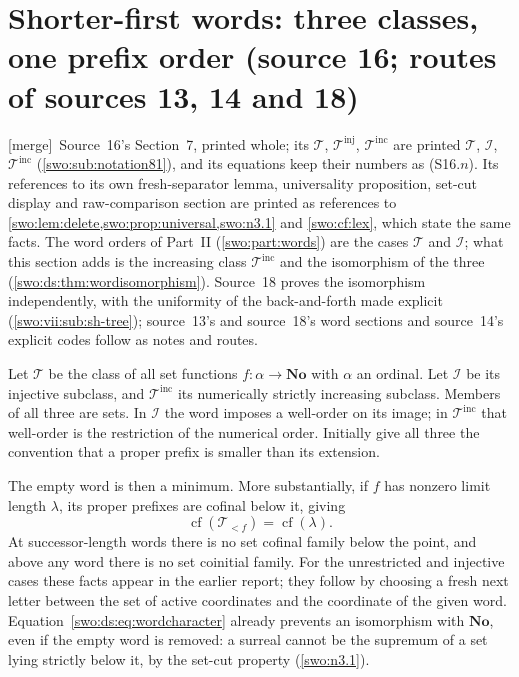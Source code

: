\documentclass[11pt]{article}
\theoremstyle{definition}
\theoremstyle{remark}
\newcommand{\No}{\mathbf{No}}
\newcommand{\Words}{\mathcal I}
\newcommand{\WordsAll}{\mathcal T}
\newcommand{\cf}{\operatorname{cf}}
\newcommand{\merge}{\textsf{[merge]}}
\newcommand{\WordsInc}{\mathcal T^{\mathrm{inc}}}
\begin{document}
\section{Shorter-first words: three classes, one prefix order (source 16; routes of sources 13, 14 and 18)}\label{swo:ds:sec:words}

\merge\ Source~16's Section~7, printed whole; its $\mathcal T$,
$\mathcal T^{\mathrm{inj}}$, $\mathcal T^{\mathrm{inc}}$ are printed $\WordsAll$,
$\Words$, $\WordsInc$ (\cref{swo:sub:notation81}), and its equations keep
their numbers as (S16.$n$). Its references to its own fresh-separator lemma,
universality proposition, set-cut display and raw-comparison section are
printed as references to \cref{swo:lem:delete,swo:prop:universal,swo:n3.1}
and \cref{swo:cf:lex}, which state the same facts. The word orders of Part~II
(\cref{swo:part:words}) are the cases $\WordsAll$ and $\Words$; what this
section adds is the increasing class $\WordsInc$ and the isomorphism of the
three (\cref{swo:ds:thm:wordisomorphism}). Source~18 proves the isomorphism
independently, with the uniformity of the back-and-forth made explicit
(\cref{swo:vii:sub:sh-tree}); source~13's and source~18's word sections and
source~14's explicit codes follow as notes and routes.

Let $\WordsAll$ be the class of all set functions $f:\alpha\to\No$ with
$\alpha$ an ordinal. Let $\Words$ be its injective subclass, and
$\WordsInc$ its numerically strictly increasing subclass. Members of all
three are sets. In $\Words$ the word imposes a well-order on its image;
in $\WordsInc$ that well-order is the restriction of the numerical order.
Initially give all three the convention that a proper prefix is smaller
than its extension.

The empty word is then a minimum. More substantially, if $f$ has nonzero
limit length $\lambda$, its proper prefixes are cofinal below it, giving
\[
 \cf(\WordsAll_{<f})=\cf(\lambda).
\tag{S16.5}\label{swo:ds:eq:wordcharacter}
\]
At successor-length words there is no set cofinal family below the point,
and above any word there is no set coinitial family. For the unrestricted
and injective cases these facts appear in the earlier report; they follow
by choosing a fresh next letter between the set of active coordinates and
the coordinate of the given word. Equation~\eqref{swo:ds:eq:wordcharacter} already
prevents an isomorphism with $\No$, even if the empty word is removed:
a surreal cannot be the supremum of a set lying strictly below it, by
the set-cut property (\cref{swo:n3.1}).
\end{document}
